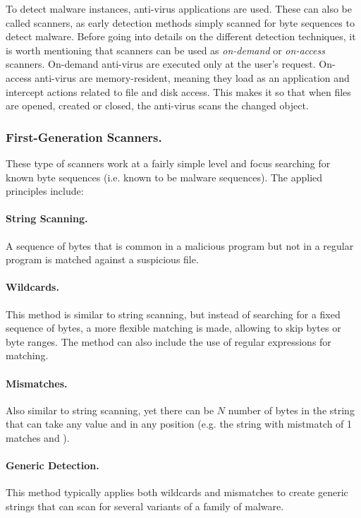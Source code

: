 \documentclass{llncs}
\begin{document}
To detect malware instances, anti-virus applications are used. These can also be called scanners, as early detection methods simply scanned for byte sequences to detect malware. Before going into details on the different detection techniques, it is worth mentioning that scanners can be used as \textit{on-demand} or \textit{on-access} scanners. On-demand anti-virus are executed only at the user's request. On-access anti-virus are memory-resident, meaning they load as an application and intercept actions related to file and disk access. This makes it so that when files are opened, created or closed, the anti-virus scans the changed object.

\subsubsection{First-Generation Scanners.} These type of scanners work at a fairly simple level and focus searching for known byte sequences (i.e. known to be malware sequences). The applied principles include:

\paragraph{String Scanning.} A sequence of bytes that is common in a malicious program but not in a regular program is matched against a suspicious file. 

\paragraph{Wildcards.} This method is similar to string scanning, but instead of searching for a fixed sequence of bytes, a more flexible matching is made, allowing to skip bytes or byte ranges. The method can also include the use of regular expressions for matching.

\paragraph{Mismatches.} Also similar to string scanning, yet there can be $N$ number of bytes in the string that can take any value and in any position (e.g. the string  with mistmatch of 1 matches  and ).

\paragraph{Generic Detection.} This method typically applies both wildcards and mismatches to create generic strings that can scan for several variants of a family of malware.
\end{document}
